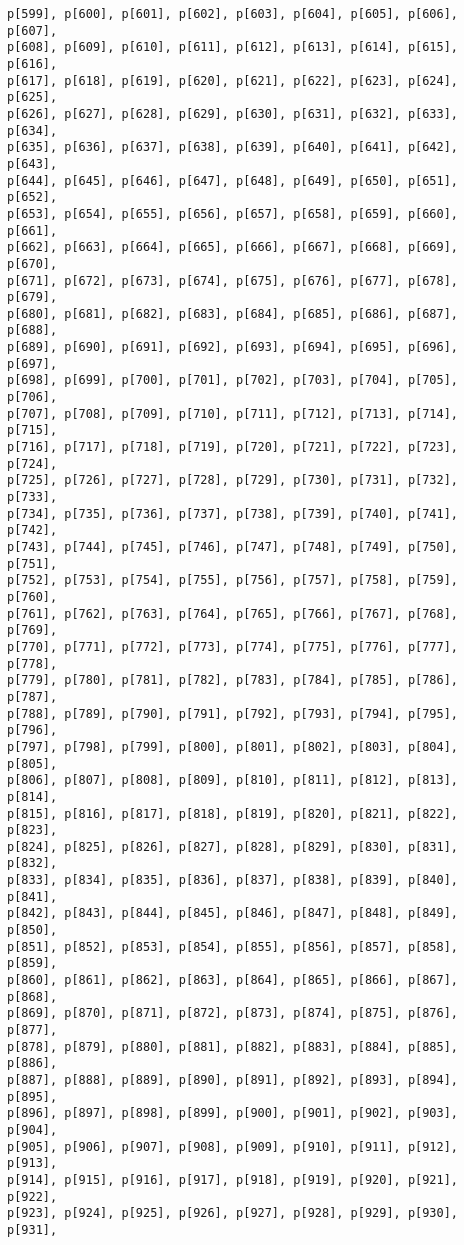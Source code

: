 \documentclass[
  letterpaper,
  DIV=11,
  numbers=noendperiod]{scrartcl}
\begin{document}
\begin{verbatim}
p[599], p[600], p[601], p[602], p[603], p[604], p[605], p[606], p[607],
p[608], p[609], p[610], p[611], p[612], p[613], p[614], p[615], p[616],
p[617], p[618], p[619], p[620], p[621], p[622], p[623], p[624], p[625],
p[626], p[627], p[628], p[629], p[630], p[631], p[632], p[633], p[634],
p[635], p[636], p[637], p[638], p[639], p[640], p[641], p[642], p[643],
p[644], p[645], p[646], p[647], p[648], p[649], p[650], p[651], p[652],
p[653], p[654], p[655], p[656], p[657], p[658], p[659], p[660], p[661],
p[662], p[663], p[664], p[665], p[666], p[667], p[668], p[669], p[670],
p[671], p[672], p[673], p[674], p[675], p[676], p[677], p[678], p[679],
p[680], p[681], p[682], p[683], p[684], p[685], p[686], p[687], p[688],
p[689], p[690], p[691], p[692], p[693], p[694], p[695], p[696], p[697],
p[698], p[699], p[700], p[701], p[702], p[703], p[704], p[705], p[706],
p[707], p[708], p[709], p[710], p[711], p[712], p[713], p[714], p[715],
p[716], p[717], p[718], p[719], p[720], p[721], p[722], p[723], p[724],
p[725], p[726], p[727], p[728], p[729], p[730], p[731], p[732], p[733],
p[734], p[735], p[736], p[737], p[738], p[739], p[740], p[741], p[742],
p[743], p[744], p[745], p[746], p[747], p[748], p[749], p[750], p[751],
p[752], p[753], p[754], p[755], p[756], p[757], p[758], p[759], p[760],
p[761], p[762], p[763], p[764], p[765], p[766], p[767], p[768], p[769],
p[770], p[771], p[772], p[773], p[774], p[775], p[776], p[777], p[778],
p[779], p[780], p[781], p[782], p[783], p[784], p[785], p[786], p[787],
p[788], p[789], p[790], p[791], p[792], p[793], p[794], p[795], p[796],
p[797], p[798], p[799], p[800], p[801], p[802], p[803], p[804], p[805],
p[806], p[807], p[808], p[809], p[810], p[811], p[812], p[813], p[814],
p[815], p[816], p[817], p[818], p[819], p[820], p[821], p[822], p[823],
p[824], p[825], p[826], p[827], p[828], p[829], p[830], p[831], p[832],
p[833], p[834], p[835], p[836], p[837], p[838], p[839], p[840], p[841],
p[842], p[843], p[844], p[845], p[846], p[847], p[848], p[849], p[850],
p[851], p[852], p[853], p[854], p[855], p[856], p[857], p[858], p[859],
p[860], p[861], p[862], p[863], p[864], p[865], p[866], p[867], p[868],
p[869], p[870], p[871], p[872], p[873], p[874], p[875], p[876], p[877],
p[878], p[879], p[880], p[881], p[882], p[883], p[884], p[885], p[886],
p[887], p[888], p[889], p[890], p[891], p[892], p[893], p[894], p[895],
p[896], p[897], p[898], p[899], p[900], p[901], p[902], p[903], p[904],
p[905], p[906], p[907], p[908], p[909], p[910], p[911], p[912], p[913],
p[914], p[915], p[916], p[917], p[918], p[919], p[920], p[921], p[922],
p[923], p[924], p[925], p[926], p[927], p[928], p[929], p[930], p[931],

\end{verbatim}
\end{document}
